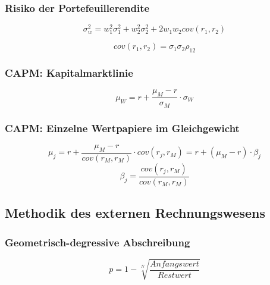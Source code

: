 \subsubsection{Risiko der Portefeuillerendite}
\[\sigma^2_w = w^2_1\sigma^2_1+w^2_2\sigma^2_2+2w_1w_2cov(r_1,r_2)\]

\[cov(r_1,r_2) = \sigma_1\sigma_2\rho_{12}\]

\subsubsection{CAPM: Kapitalmarktlinie}
\[\mu_W = r + \frac{\mu_M-r}{\sigma_M}\cdot\sigma_W\]

\subsubsection{CAPM: Einzelne Wertpapiere im Gleichgewicht}
\[\mu_j = r + \frac{\mu_M-r}{cov(r_M,r_M)}\cdot cov(r_j,r_M) = r + (\mu_M-r)\cdot \beta_j\]
\[\beta_j = \frac{cov(r_j,r_M)}{cov(r_M,r_M)}\]


\subsection{Methodik des externen Rechnungswesens}

\subsubsection{Geometrisch-degressive Abschreibung}
\[p = 1 - \sqrt[N]{\frac{Anfangswert}{Restwert}}\]
